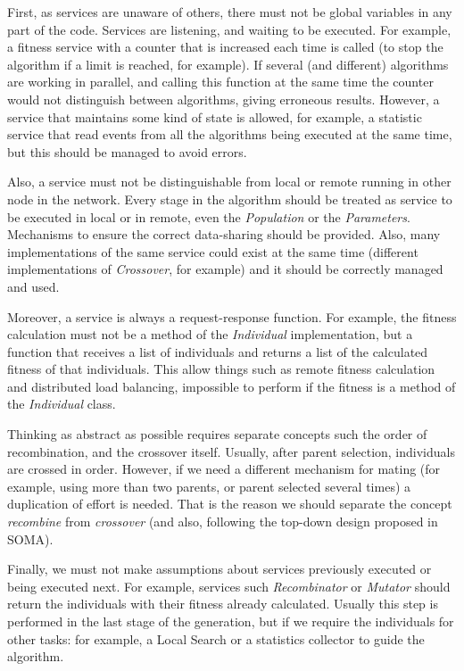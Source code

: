First, as services are unaware of others, there must not be global variables in any part of the code. Services are listening, and waiting to be executed. For example, a fitness service with a counter that is increased each time is called (to stop the algorithm if a limit is reached, for example). If several (and different) algorithms are working in parallel, and calling this function at the same time the counter would not distinguish between algorithms, giving erroneous results. However, a service that maintains some kind of state is allowed, for example, a statistic service that read events from all the algorithms being executed at the same time, but this should be managed to avoid errors.

Also, a service must not be distinguishable from local or remote running in other node in the network. Every stage in the algorithm should be treated as service to be executed in local or in remote, even the {\em Population} or the {\em Parameters}. Mechanisms to ensure the correct data-sharing should be provided. Also, many implementations of the same service could exist at the same time (different implementations of {\em Crossover}, for example) and it should be correctly managed and used.

Moreover, a service is always a request-response function. For example, the fitness calculation must not be a method of the {\em Individual} implementation, but a function that receives a list of individuals and returns a list of the calculated fitness of that individuals. This allow things such as remote fitness calculation and distributed load balancing, impossible to perform if the fitness is a method of the {\em Individual} class.

Thinking as abstract as possible requires separate concepts such the order of recombination, and the crossover itself. Usually, after parent selection, individuals are crossed in order. However, if we need a different mechanism for mating (for example, using more than two parents, or parent selected several times) a duplication of effort is needed. That is the reason we should separate the concept {\em recombine} from {\em crossover} (and also, following the top-down design proposed in SOMA). 

Finally, we must not make assumptions about services previously executed or being executed next. For example, services such {\em Recombinator} or {\em Mutator} should return the individuals with their fitness already calculated. Usually this step is performed in the last stage of the generation, but if we require the individuals for other tasks: for example, a Local Search or a statistics collector to guide the algorithm.

